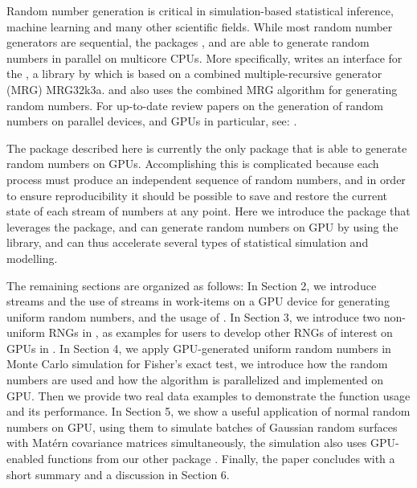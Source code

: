 \documentclass[article,nojss]{jss}\usepackage[]{graphicx}\usepackage[]{color}
\newcommand{\fct}[1]{\code{#1()}}
\begin{document}
Random number generation is critical in simulation-based statistical inference, machine learning and many other scientific fields. While most random number generators are sequential, the  packages ,  \citep*{future1.19.1} and  \citep{sevcikova2015package} are able to generate random numbers in parallel on multicore CPUs. More specifically,  writes an interface for the , a  library by \cite{l2002object} which is based on a combined multiple-recursive generator (MRG) MRG32k3a.  and  also uses the combined MRG algorithm for generating random numbers. For up-to-date review papers on the generation of random numbers on parallel devices, and GPUs in particular, see:  \cite{rLEC15a,rLEC17p,rLEC21a}.


The  package described here is currently the only  package that is able to generate random numbers on GPUs. Accomplishing this is complicated because each process must produce an independent sequence of random numbers, and in order to ensure reproducibility it should be possible to save and restore the current state of each stream of numbers at any point.  Here we introduce the  package  that leverages the  package, and can generate random numbers on GPU by using the  \citep{l2015clrng} library, and can thus accelerate several types of statistical simulation and modelling.



The remaining sections are organized as follows:
In Section 2, we introduce streams and the use of streams in work-items on a GPU device for generating uniform random numbers, and the usage of \fct{clrng::runif}.
In Section 3, we introduce two non-uniform RNGs in , as examples for users to develop other RNGs of interest on GPUs in .
In Section 4, we apply GPU-generated uniform random numbers in Monte Carlo simulation for Fisher’s exact test, we introduce how the random numbers are used and how the algorithm is parallelized and implemented on GPU. Then we provide two real data examples to demonstrate the function usage and its  performance.
In Section 5, we show a useful application of normal random numbers on GPU, using them to simulate batches of Gaussian random surfaces with Mat\'ern covariance matrices simultaneously, the simulation also uses GPU-enabled functions from our other package .
Finally, the paper concludes with a short summary and a discussion in Section 6.
\end{document}
